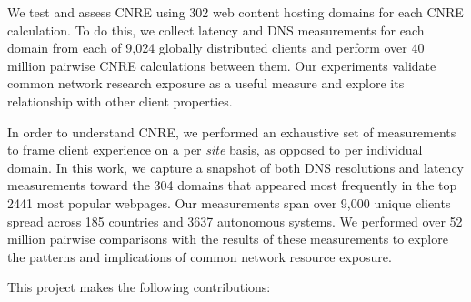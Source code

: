 We test and assess CNRE using 302 web content hosting domains for each CNRE
calculation.  To do this, we collect latency and DNS measurements for each
domain from each of 9,024 globally distributed clients and perform over 40
million pairwise CNRE calculations between them. Our experiments 
validate common network research exposure as a useful measure and explore its
relationship with other client properties.


In order to understand CNRE, we performed an exhaustive set of measurements to frame
client experience on a per \emph{site} basis, as opposed to per individual domain. In this work, we capture a
snapshot of both DNS resolutions and latency measurements toward the 304 domains that appeared most
frequently in the top 2441 most popular webpages. Our measurements span over
9,000 unique
clients spread across 185 countries and 3637 autonomous systems. We performed over 52 million pairwise
comparisons with the results of these measurements to explore the patterns and implications of common network resource exposure. 

This project makes the following contributions: 

